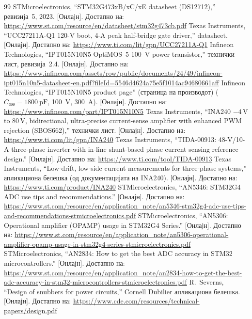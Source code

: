 \documentclass[journal,onecolumn,11pt]{IEEEtran}
\begin{document}
\begin{thebibliography}{99}
 STMicroelectronics, ``STM32G473xB/xC/xE datasheet (DS12712),'' ревизија~5, 2023.
[Онлајн]. Достапно на: \url{https://www.st.com/resource/en/datasheet/stm32g473cb.pdf}
 Texas Instruments, ``UCC27211A-Q1 120-V boot, 4-A peak half-bridge gate driver,''
datasheet. [Онлајн]. Достапно на: \url{https://www.ti.com/lit/gpn/UCC27211A-Q1}
 Infineon Technologies, ``IPT015N10N5 OptiMOS\texttrademark~5 \SI{100}{\volt}
power transistor,'' технички лист, ревизија~2.4. [Онлајн]. Достапно на:
\url{https://www.infineon.com/assets/row/public/documents/24/49/infineon-ipt015n10n5-datasheet-en.pdf?fileId=5546d4624a75e5f1014ac94680661aff}
 Infineon Technologies, ``IPT015N10N5 product page'' (страница на производот)
(\(C_{\mathrm{oss}}=\SI{1800}{\pico\farad}\), \SI{100}{\volt}, \SI{300}{\ampere}). [Онлајн]. Достапно на:
\url{https://www.infineon.com/part/IPT015N10N5}
 Texas Instruments, ``INA240 $-4$\,V to $80$\,V, bidirectional, ultra-precise
current-sense amplifier with enhanced PWM rejection (SBOS662),'' технички лист. [Онлајн]. Достапно на:
\url{https://www.ti.com/lit/gpn/INA240}
 Texas Instruments, ``TIDA-00913: 48-V/10-A three-phase inverter with in-line
shunt-based phase current sensing reference design.'' [Онлајн]. Достапно на:
\url{https://www.ti.com/tool/TIDA-00913}
 Texas Instruments, ``Low-drift, low-side current measurements for
three-phase systems,'' апликациона белешка (од документацијата на INA240). [Онлајн]. Достапно на:
\url{https://www.ti.com/product/INA240}
 STMicroelectronics, ``AN5346: STM32G4 ADC use tips and recommendations.'' [Онлајн].
Достапно на:
\url{https://www.st.com/resource/en/application_note/an5346-stm32g4-adc-use-tips-and-recommendations-stmicroelectronics.pdf}
 STMicroelectronics, ``AN5306: Operational amplifier (OPAMP) usage in STM32G4 Series.''
[Онлајн]. Достапно на:
\url{https://www.st.com/resource/en/application_note/an5306-operational-amplifier-opamp-usage-in-stm32g4-series-stmicroelectronics.pdf}
 STMicroelectronics, ``AN2834: How to get the best ADC accuracy in STM32
microcontrollers.'' [Онлајн]. Достапно на:
\url{https://www.st.com/resource/en/application_note/an2834-how-to-get-the-best-adc-accuracy-in-stm32-microcontrollers-stmicroelectronics.pdf}
 R.~Severns, ``Design of snubbers for power circuits,'' Cornell Dubilier апликациона белешка. [Онлајн]. Достапно на: \url{https://www.cde.com/resources/technical-papers/design.pdf}

\end{thebibliography}
\end{document}
